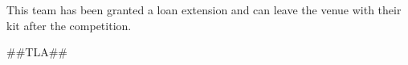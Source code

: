 \documentclass[a4paper, margin=0]{article}
\begin{document}
    \begin{center}

\vspace*{\fill}

\tiny{This team has been granted a loan extension and can leave the venue with their kit after the competition.}

\vspace{3cm}

\huge{##TLA##}

\vspace*{\fill}

\end{center}
\end{document}
